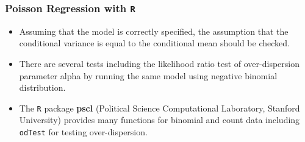 \documentclass[00-GLMregslides.tex]{subfiles}
\begin{document}
\begin{frame}[fragile]
\frametitle{Poisson Regression with \texttt{R}}
	\Large
\begin{itemize}
\item Assuming that the model is correctly specified, the assumption that the conditional variance is equal 
to the conditional mean should be checked. 
\item There are several tests including the likelihood ratio test of over-dispersion parameter alpha by running the 
same model using negative binomial distribution. 
\item The \texttt{R} package \textbf{pscl} (Political Science Computational Laboratory, Stanford University) provides many functions for binomial 
and count data including \texttt{odTest} for testing over-dispersion. 
\end{itemize}
\end{frame}
\end{document}
